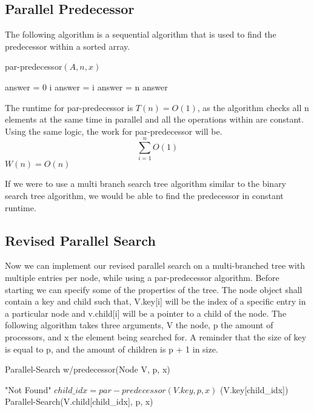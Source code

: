 \documentclass[11pt]{article}
\begin{document}
\subsection{Parallel Predecessor}
 The following algorithm is a sequential algorithm that is used to find the predecessor within a sorted array.

\begin{algorithm}
\caption{par-predecessor$(A, n, x)$}
\begin{algorithmic}
\STATE answer = 0
    	\RETURN i
    	\STATE answer = i
	\ENDIF
    	\STATE answer = n
	\ENDIF
	\RETURN answer
\ENDFOR
\end{algorithmic}
\end{algorithm}

The runtime for par-predecessor is $T(n) = O(1)$, as the algorithm checks all n elements at the same time in parallel and all the operations within are constant.
Using the same logic, the work for par-predecessor will be. $$\sum_{i=1}^{n}O(1)$$
$W(n) = O(n)$

If we were to use a multi branch search tree algorithm similar to the binary search tree algorithm, we would be able to find the predecessor in  constant runtime.


\subsection{Revised Parallel Search}

Now we can implement our revised parallel search on a multi-branched tree with multiple entries per node, while using a par-predecessor algorithm. Before starting we can specify some of the properties of the tree. The node object shall contain a key and child such that, V.key[i] will be the index of a specific entry in a particular node and v.child[i] will be a pointer to a child of the node. The following algorithm takes three arguments, V the node, p the amount of processors, and x the element being searched for. A reminder that the size of key is equal to p, and the amount of children is p + 1 in size.

\begin{algorithm}
\caption{Parallel-Search w/predecessor(Node V, p, x)}
\begin{algorithmic}
	\RETURN "Not Found"
\ENDIF
\STATE $child\_idx = par-predecessor(V.key, p, x)$
	\RETURN (V.key[child\_idx])
\ELSE
	\RETURN Parallel-Search(V.child[child\_idx], p, x)
\ENDIF
\end{algorithmic}
\end{algorithm}
\end{document}
